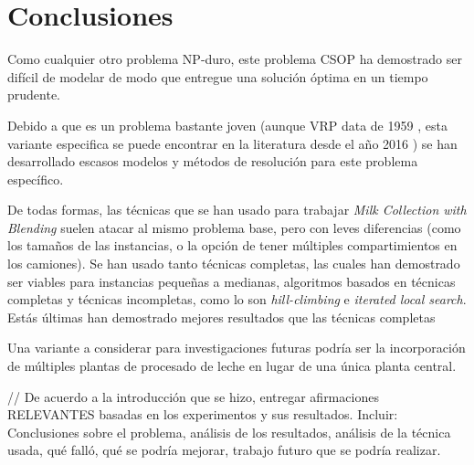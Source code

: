 \section{Conclusiones}

Como cualquier otro problema NP-duro, este problema CSOP ha demostrado ser difícil de modelar de modo que entregue una solución óptima en un tiempo prudente.

Debido a que es un problema bastante joven (aunque VRP data de 1959 \cite{TruckDispatchingProblem}, esta variante especifica se puede encontrar en la literatura desde el año 2016 \cite{MilkWithBlending}) se han desarrollado escasos modelos y métodos de resolución para este problema específico.

De todas formas, las técnicas que se han usado para trabajar \textit{Milk Collection with Blending} suelen atacar al mismo problema base, pero con leves diferencias (como los tamaños de las instancias, o la opción de tener múltiples compartimientos en los camiones). Se han usado tanto técnicas completas, las cuales han demostrado ser viables para instancias pequeñas a medianas, algoritmos basados en técnicas completas y técnicas incompletas, como lo son \textit{hill-climbing} e \textit{iterated local search}. Estás últimas han demostrado mejores resultados que las técnicas completas

Una variante a considerar para investigaciones futuras podría ser la incorporación de múltiples plantas de procesado de leche en lugar de una única planta central.



// De acuerdo a la introducci\'on que se hizo, entregar afirmaciones RELEVANTES basadas en los experimentos y sus resultados. Incluir: Conclusiones sobre el problema, an\'alisis de los resultados, an\'alisis de la t\'ecnica usada, qu\'e fall\'o, qu\'e se podr\'ia mejorar, trabajo futuro que se podr\'ia realizar.


